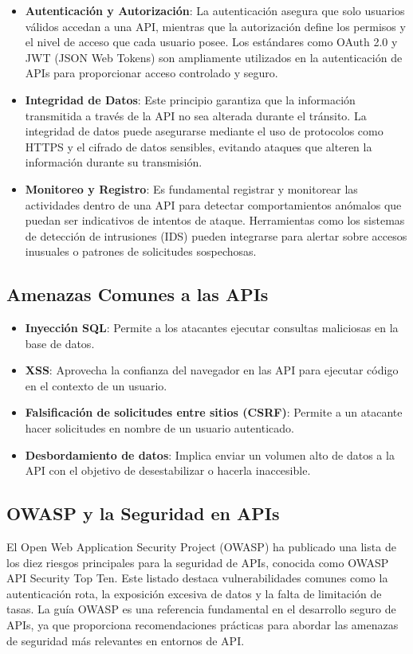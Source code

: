 \documentclass{article}
\begin{document}
    \begin{itemize}
        \item \textbf{Autenticación y Autorización}: La autenticación asegura que solo usuarios válidos accedan a una API, mientras que la autorización define los permisos y el nivel de acceso que cada usuario posee. Los estándares como OAuth 2.0 y JWT (JSON Web Tokens) son ampliamente utilizados en la autenticación de APIs para proporcionar acceso controlado y seguro.
        \item \textbf{Integridad de Datos}: Este principio garantiza que la información transmitida a través de la API no sea alterada durante el tránsito. La integridad de datos puede asegurarse mediante el uso de protocolos como HTTPS y el cifrado de datos sensibles, evitando ataques que alteren la información durante su transmisión.
        \item \textbf{Monitoreo y Registro}: Es fundamental registrar y monitorear las actividades dentro de una API para detectar comportamientos anómalos que puedan ser indicativos de intentos de ataque. Herramientas como los sistemas de detección de intrusiones (IDS) pueden integrarse para alertar sobre accesos inusuales o patrones de solicitudes sospechosas.
    \end{itemize}

    \subsection{Amenazas Comunes a las APIs}
    \begin{itemize}
        \item \textbf{Inyección SQL}: Permite a los atacantes ejecutar consultas maliciosas en la base de datos.
        \item \textbf{XSS}: Aprovecha la confianza del navegador en las API para ejecutar código en el contexto de un usuario.
        \item \textbf{Falsificación de solicitudes entre sitios (CSRF)}: Permite a un atacante hacer solicitudes en nombre de un usuario autenticado.
        \item \textbf{Desbordamiento de datos}: Implica enviar un volumen alto de datos a la API con el objetivo de desestabilizar o hacerla inaccesible.
    \end{itemize}

    \subsection{OWASP y la Seguridad en APIs}
    El Open Web Application Security Project (OWASP) ha publicado una lista de los diez riesgos principales para la seguridad de APIs, conocida como OWASP API Security Top Ten. Este listado destaca vulnerabilidades comunes como la autenticación rota, la exposición excesiva de datos y la falta de limitación de tasas. La guía OWASP es una referencia fundamental en el desarrollo seguro de APIs, ya que proporciona recomendaciones prácticas para abordar las amenazas de seguridad más relevantes en entornos de API.
\end{document}
